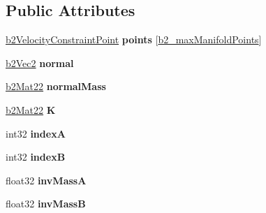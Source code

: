 \subsection*{Public Attributes}
\begin{DoxyCompactItemize}
\item 
\mbox{\label{structb2ContactVelocityConstraint_a3279f8575860a6e9b12c3905b5cc1b5a}} 
\hyperlink{structb2VelocityConstraintPoint}{b2\+Velocity\+Constraint\+Point} {\bfseries points} \mbox{[}\hyperlink{_2cocos2d_2external_2Box2D_2include_2Box2D_2Common_2b2Settings_8h_aa5f44cc9edf711433dea2b2ec94f3c42}{b2\+\_\+max\+Manifold\+Points}\mbox{]}
\item 
\mbox{\label{structb2ContactVelocityConstraint_a1da730d689f89bd89cab06c5792f9bf3}} 
\hyperlink{structb2Vec2}{b2\+Vec2} {\bfseries normal}
\item 
\mbox{\label{structb2ContactVelocityConstraint_a0ee46cdf9b9136484e6a2ca25ac7cd4b}} 
\hyperlink{structb2Mat22}{b2\+Mat22} {\bfseries normal\+Mass}
\item 
\mbox{\label{structb2ContactVelocityConstraint_a36c427f978d6f390552220b8ad21e1a9}} 
\hyperlink{structb2Mat22}{b2\+Mat22} {\bfseries K}
\item 
\mbox{\label{structb2ContactVelocityConstraint_a44a5ddedc5058c2453e873b999acd547}} 
int32 {\bfseries indexA}
\item 
\mbox{\label{structb2ContactVelocityConstraint_a55a9fd87a6e560fe83d81d6b9c14f356}} 
int32 {\bfseries indexB}
\item 
\mbox{\label{structb2ContactVelocityConstraint_a529003546429532d186130ca35f2178e}} 
float32 {\bfseries inv\+MassA}
\item 
\mbox{\label{structb2ContactVelocityConstraint_ac75c816e94402ed4d93f232d211d4f62}} 
float32 {\bfseries inv\+MassB}
\item 
\mbox{\label{structb2ContactVelocityConstraint_ac6c18706a9ee89c5a682dc610e86e00f}} 

\end{DoxyCompactItemize}
